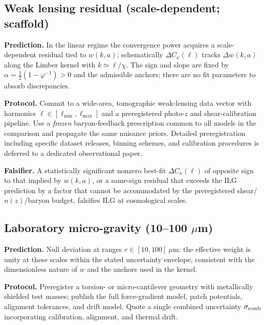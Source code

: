 \documentclass[11pt]{article}
\begin{document}
\subsection{Weak lensing residual (scale-dependent; scaffold)}\label{subsec:pred-lensing}
\textbf{Prediction.} In the linear regime the convergence power acquires a scale-dependent residual tied to \(w(k,a)\); schematically \(\Delta C_\kappa(\ell)\) tracks \(\Delta w(k,a)\) along the Limber kernel with \(k\!\simeq\!\ell/\chi\). The sign and slope are fixed by \(\alpha=\tfrac12(1-\varphi^{-1})>0\) and the admissible anchors; there are no fit parameters to absorb discrepancies.

\textbf{Protocol.} Commit to a wide-area, tomographic weak-lensing data vector with harmonics \(\ell\in[\ell_{\min},\ell_{\max}]\) and a preregistered photo-\(z\) and shear-calibration pipeline. Use a \emph{frozen} baryon-feedback prescription common to all models in the comparison and propagate the same nuisance priors. Detailed preregistration including specific dataset releases, binning schemes, and calibration procedures is deferred to a dedicated observational paper.

\textbf{Falsifier.} A statistically significant nonzero best-fit \(\Delta C_\kappa(\ell)\) of opposite sign to that implied by \(w(k,a)\), or a same-sign residual that exceeds the ILG prediction by a factor that cannot be accommodated by the preregistered shear/\(n(z)\)/baryon budget, falsifies ILG at cosmological scales.

\subsection{Laboratory micro-gravity (10--100 \texorpdfstring{$\mu$m}{micron})}\label{subsec:pred-micro}
\textbf{Prediction.} Null deviation at ranges \(r\in[10,100]~\mu\mathrm{m}\): the effective weight is unity at these scales within the stated uncertainty envelope, consistent with the dimensionless nature of \(w\) and the anchors used in the kernel.%

\textbf{Protocol.} Preregister a torsion- or micro-cantilever geometry with metallically shielded test masses; publish the full force-gradient model, patch potentials, alignment tolerances, and drift model. Quote a single combined uncertainty \(\sigma_{\rm comb}\) incorporating calibration, alignment, and thermal drift.
\end{document}
